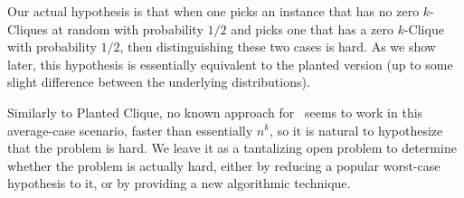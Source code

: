 Our actual hypothesis is that when one picks an instance that has no zero $k$-Cliques at random with probability $1/2$ and picks one that has a zero $k$-Clique with probability $1/2$, then distinguishing these two cases is hard. As we show later, this hypothesis is essentially equivalent to the planted version (up to some slight difference between the underlying distributions). 

Similarly to Planted Clique, no known approach for \zkclique~seems to work in this average-case scenario, faster than essentially $n^k$, so it is natural to hypothesize that the problem is hard. 
We leave it as a tantalizing open problem to determine whether the problem is actually hard, either by reducing a popular worst-case hypothesis to it, or by providing a new algorithmic technique.



